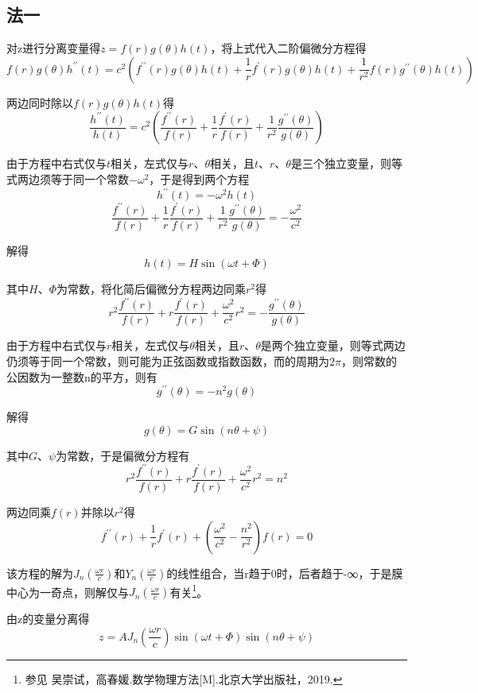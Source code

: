 \subsection{法一}

对z进行分离变量得$z=f(r)g(\theta)h(t)$，将上式代入二阶偏微分方程得
$$f(r) g(\theta) h^{\prime \prime}(t)=c^2\left(f^{\prime \prime}(r) g(\theta) h(t)+\frac{1}{r} f^{\prime}(r) g(\theta) h(t)+\frac{1}{r^2} f(r) g^{\prime \prime}(\theta) h(t)\right)$$

两边同时除以$f(r)g(\theta)h(t)$得
$$\frac{h^{\prime \prime}(t)}{h(t)}=c^2\left(\frac{f^{\prime \prime}(r)}{f(r)}+\frac{1}{r} \frac{f^{\prime}(r)}{f(r)}+\frac{1}{r^2} \frac{g^{\prime \prime}(\theta)}{g(\theta)}\right)$$

由于方程中右式仅与$t$相关，左式仅与$r\text{、}\theta$相关，且$t\text{、}r\text{、}\theta$是三个独立变量，则等式两边须等于同一个常数$-\omega^2$，于是得到两个方程$$h^{\prime \prime}(t)=-\omega^2 h(t)$$
$$\frac{f^{\prime \prime}(r)}{f(r)}+\frac{1}{r} \frac{f^{\prime}(r)}{f(r)}+\frac{1}{r^2} \frac{g^{\prime \prime}(\theta)}{g(\theta)}=-\frac{\omega^2}{c^2}$$

解得
$$h(t)=H \sin (\omega t+\Phi)$$

其中$H\text{、}\Phi$为常数，将化简后偏微分方程两边同乘$r^2$得
$$r^2 \frac{f^{\prime \prime}(r)}{f(r)}+r \frac{f^{\prime}(r)}{f(r)}+\frac{\omega^2}{c^2} r^2=-\frac{g^{\prime \prime}(\theta)}{g(\theta)}$$

由于方程中右式仅与$r$相关，左式仅与$\theta$相关，且$r\text{、}\theta$是两个独立变量，则等式两边仍须等于同一个常数，则可能为正弦函数或指数函数，而的周期为$2\pi$，则常数的公因数为一整数n的平方，则有
$$g^{\prime \prime}(\theta)=-n^2g(\theta)$$

解得
$$g(\theta)=G \sin (n \theta+\psi)$$

其中$G\text{、}\psi$为常数，于是偏微分方程有$$r^2 \frac{f^{\prime \prime}(r)}{f(r)}+r \frac{f^{\prime}(r)}{f(r)}+\frac{\omega^2}{c^2} r^2=n^2$$

两边同乘$f(r)$并除以$r^2$得
$$f^{\prime \prime}(r)+\frac{1}{r} f^{\prime}(r)+\left(\frac{\omega^2}{c^2}-\frac{n^2}{r^2}\right) f(r)=0$$

该方程的解为$J_n(\frac{\omega r}c)$和$Y_n(\frac{\omega r}c)$的线性组合，当r趋于0时，后者趋于-∞，于是膜中心为一奇点，则解仅与$J_n(\frac{\omega r}c)$有关\footnote{参见 吴崇试，高春媛.数学物理方法[M].北京大学出版社，2019.}。

由z的变量分离得
$$z=A J_n\left(\frac{\omega r}{c}\right) \sin (\omega t+\Phi) \sin (n \theta+\psi)$$

